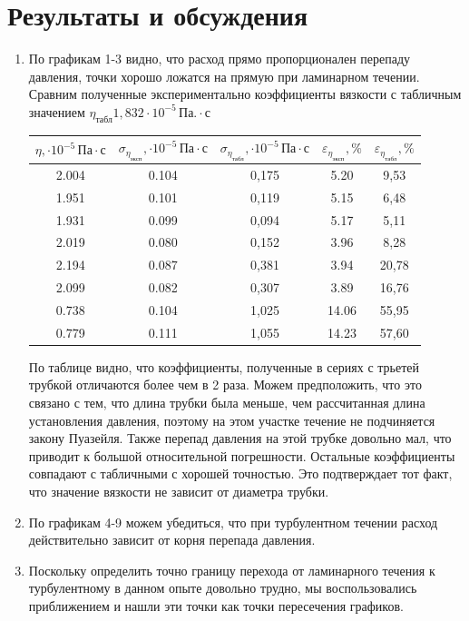 \documentclass[a4paper,12pt]{article}
\begin{document}
    \section{Результаты и обсуждения}
\begin{enumerate}
\item По графикам 1-3 видно, что расход прямо пропорционален перепаду давления, точки хорошо ложатся на прямую при ламинарном течении. Сравним полученные экспериментально коэффициенты вязкости с табличным значением $\eta_{\text{табл}} 1,832 \cdot 10^{-5} \, \text{Па}. \cdot \text{с}$
\begin{table}[h!]
    \centering
    \begin{tabular}{|c|c|c|c|c|}
        \hline
        $\eta, \cdot 10^{-5} \, \text{Па} \cdot \text{с}$ & $\sigma_{\eta_{\text{эксп}}}, \cdot 10^{-5} \, \text{Па} \cdot \text{с}$ & $\sigma_{\eta_{\text{табл}}}, \cdot 10^{-5} \, \text{Па} \cdot \text{с}$ & $\varepsilon_{\eta_{\text{эксп}}}, \%$ & $\varepsilon_{\eta_{\text{табл}}}, \%$ \\
        \hline
        2.004 & 0.104  & 0,175 & 5.20  & 9,53 \\ \hline
        1.951 & 0.101  & 0,119 & 5.15  & 6,48 \\ \hline
        1.931 & 0.099  & 0,094 & 5.17  & 5,11 \\ \hline
        2.019 & 0.080  & 0,152 & 3.96  & 8,28 \\ \hline
        2.194 & 0.087  & 0,381 & 3.94  & 20,78 \\ \hline
        2.099 & 0.082  & 0,307 & 3.89  & 16,76 \\ \hline
        0.738 & 0.104  & 1,025 & 14.06 & 55,95 \\ \hline
        0.779 & 0.111  & 1,055 & 14.23 & 57,60 \\ \hline
    \end{tabular}
\end{table}
По таблице видно, что коэффициенты, полученные в сериях с трьетей трубкой отличаются более чем в 2 раза. Можем предположить, что это связано с тем, что длина трубки была меньше, чем рассчитанная длина установления давления, поэтому на этом участке течение не подчиняется закону Пуазейля. Также перепад давления на этой трубке довольно мал, что приводит к большой относительной погрешности. Остальные коэффициенты совпадают с табличными с хорошей точностью. Это подтверждает тот факт, что значение вязкости не зависит от диаметра трубки.
\item По графикам 4-9 можем убедиться, что при турбулентном течении расход действительно зависит от корня перепада давления.
\item Поскольку определить точно границу перехода от ламинарного течения к турбулентному в данном опыте довольно трудно, мы воспользовались приближением и нашли эти точки как точки пересечения графиков. 

\end{enumerate}
\end{document}

